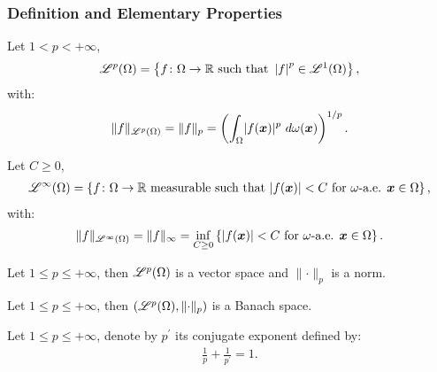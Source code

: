 \newpage
\subsubsection{Definition and Elementary Properties}

\begin{definition}
    Let $1 < p < +\infty$,
    \begin{align}
        \mathscr{L}^{p}(\Omega) = \left\{ f \colon \Omega \rightarrow \mathbb{R} \text{ such that } \left| f \right|^p \in \mathscr{L}^{1}(\Omega) \right\},
    \end{align}
    with:
    \begin{align}
    \lVert f \rVert_{\mathscr{L}^{p}(\Omega)} = \lVert f \rVert_{p} = \left( \int_{\Omega} \lvert f(\bm{x}) \rvert^p ~ d \omega(\bm{x}) \right)^{1/p}.
    \end{align}
\end{definition}

\begin{definition}[$\SpaceLp{\infty}(\Omega)$]
    Let $C \geq 0$,
    \begin{align}
        \mathscr{L}^{\infty}(\Omega) = \left\{ f \colon \Omega \rightarrow \mathbb{R} \text{ measurable such that } \lvert f(\bm{x}) \rvert < C \text{ for } \omega \text{-a.e. } \bm{x} \in \Omega \right\},
    \end{align}
    with:
    \begin{align}
    \lVert f \rVert_{\mathscr{L}^{\infty}(\Omega)} = \lVert f \rVert_{\infty} = \inf_{C \geq 0} \left\{ \lvert f(\bm{x}) \rvert < C \text{ for } \omega \text{-a.e. } \bm{x} \in \Omega \right\}.
    \end{align}
\end{definition}

\begin{theorem}
    Let $1 \leq p \leq +\infty$, then $\mathscr{L}^{p}(\Omega)$ is a vector space and $\lVert \cdot \rVert_p$ is a norm.
\end{theorem}

\begin{theorem}
    Let $1 \leq p \leq +\infty$, then $(\mathscr{L}^{p}(\Omega), \lVert \cdot \rVert_p)$ is a Banach space.
\end{theorem}

\begin{definition}
    Let $1 \leq p \leq +\infty$, denote by $p^{\prime}$ its conjugate exponent defined by:
    \begin{align}
        \frac{1}{p} + \frac{1}{p^{\prime}} = 1.
    \end{align}
\end{definition}

